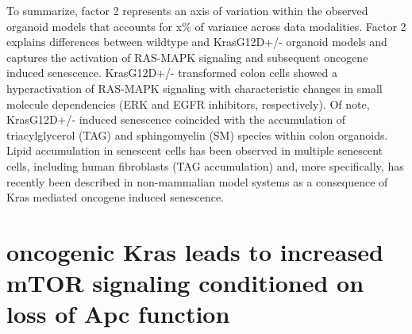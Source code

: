\begin{flushleft}
\smallbreak

To summarize, factor 2 represents an axis of variation within the observed organoid models that accounts for x\% of variance across data modalities.  
Factor 2 explains differences between wildtype and KrasG12D+/- organoid models and captures the activation of RAS-MAPK signaling and subsequent oncogene induced senescence. KrasG12D+/- transformed colon cells showed a hyperactivation of RAS-MAPK signaling with characteristic changes in small molecule dependencies (ERK and EGFR inhibitors, respectively). Of note, KrasG12D+/- induced senescence coincided with the accumulation of triacylglycerol (TAG) and sphingomyelin (SM) species within colon organoids. Lipid accumulation in senescent cells has been observed in multiple senescent cells, including human fibroblasts (TAG accumulation) and, more specifically, has recently been described in non-mammalian model systems as a consequence of Kras mediated oncogene induced senescence. 



\newpage
\section{oncogenic Kras leads to increased mTOR signaling conditioned on loss of Apc function}


\end{flushleft}
